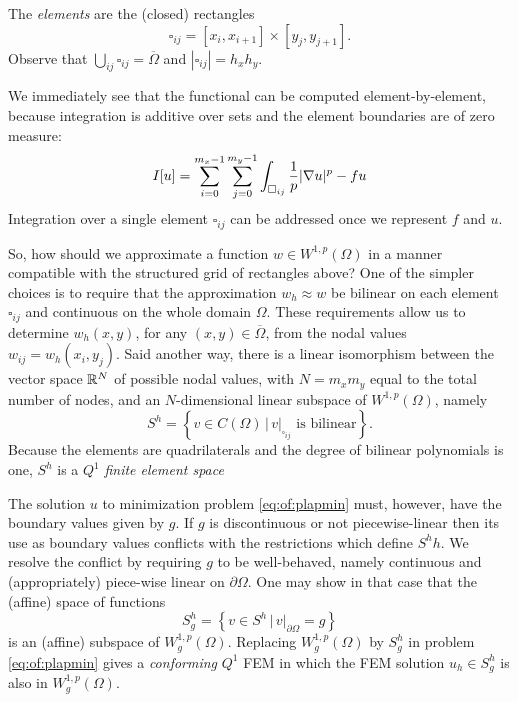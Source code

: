 The \emph{elements} are the (closed) rectangles
   $$\square_{ij} = [x_i,x_{i+1}] \times [y_j,y_{j+1}].$$
Observe that $\bigcup_{ij} \square_{ij} = \overline{\Omega}$ and $|\square_{ij}| = h_x h_y$.

We immediately see that the functional can be computed element-by-element, because integration is additive over sets and the element boundaries are of zero measure:
\begin{equation}
I[u] = \sum_{i=0}^{m_x-1} \sum_{j=0}^{m_y-1} \int_{\square_{ij}} \frac{1}{p} |\nabla u|^p - fu  \label{eq:of:sumoverelements}
\end{equation}
Integration over a single element $\square_{ij}$ can be addressed once we represent $f$ and $u$.

So, how should we approximate a function $w \in W^{1,p}(\Omega)$ in a manner compatible with the structured grid of rectangles above?  One of the simpler choices is to require that the approximation $w_h \approx w$ be bilinear on each element $\square_{ij}$ and continuous on the whole domain $\Omega$.  These requirements allow us to determine $w_h(x,y)$, for any $(x,y)\in \overline\Omega$, from the nodal values $w_{ij} = w_h(x_i,y_j)$.  Said another way, there is a linear isomorphism between the vector space $\mathbb{R}^N$ of possible nodal values, with $N=m_x m_y$ equal to the total number of nodes, and an $N$-dimensional linear subspace of $W^{1,p}(\Omega)$, namely
\begin{equation}
S^h = \left\{v \in C(\Omega) \, \Big| \, v|_{\square_{ij}} \text{ is bilinear}\right\}. \label{eq:of:Shdefn}
\end{equation}
Because the elements are quadrilaterals and the degree of bilinear polynomials is one, $S^h$ is a $Q^1$ \emph{finite element space} \citep{Elmanetal2005}

The solution $u$ to minimization problem \eqref{eq:of:plapmin} must, however, have the boundary values given by $g$.  If $g$ is discontinuous or not piecewise-linear then its use as boundary values conflicts with the restrictions which define $S^hh$.  We resolve the conflict by requiring $g$ to be well-behaved, namely continuous and (appropriately) piece-wise linear on $\partial\Omega$.  One may show in that case that the (affine) space of functions
\begin{equation}
S_g^h = \left\{v \in S^h \, \Big| \, v|_{\partial \Omega} = g\right\} \label{eq:of:Sghdefn}
\end{equation}
is an (affine) subspace of $W_g^{1,p}(\Omega)$.  Replacing $W_g^{1,p}(\Omega)$ by $S_g^h$ in problem \eqref{eq:of:plapmin} gives a \emph{conforming} $Q^1$ FEM in which the FEM solution $u_h\in S_g^h$ is also in $W_g^{1,p}(\Omega)$.

